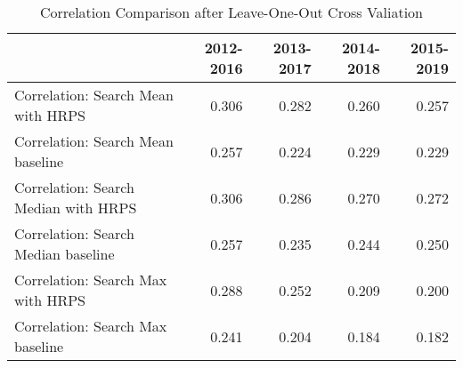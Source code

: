 \begin{table}[ht]
\centering
\begin{tabular}{|l|rrrr|}
  \hline
 & 2012-2016 & 2013-2017 & 2014-2018 & 2015-2019 \\ 
  \hline
Correlation: Search Mean with HRPS & 0.306 & 0.282 & 0.260 & 0.257 \\ 
  Correlation: Search Mean baseline & 0.257 & 0.224 & 0.229 & 0.229 \\ 
  Correlation: Search Median with HRPS & 0.306 & 0.286 & 0.270 & 0.272 \\ 
  Correlation: Search Median baseline & 0.257 & 0.235 & 0.244 & 0.250 \\ 
  Correlation: Search Max with HRPS & 0.288 & 0.252 & 0.209 & 0.200 \\ 
  Correlation: Search Max baseline & 0.241 & 0.204 & 0.184 & 0.182 \\ 
   \hline
\end{tabular}
\caption{Correlation Comparison after Leave-One-Out Cross Valiation} 
\end{table}
